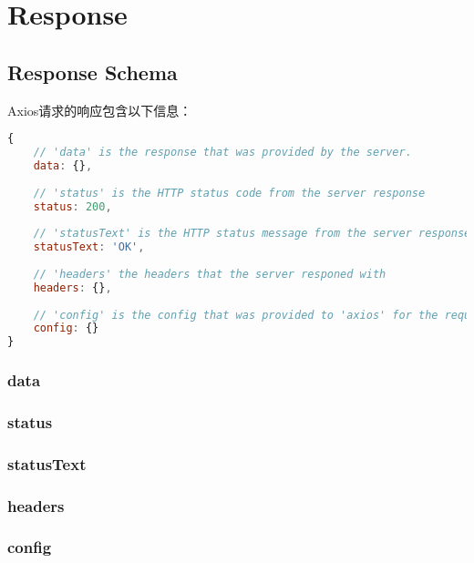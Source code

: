 \chapter{Response}



\section{Response Schema}


Axios请求的响应包含以下信息：



\begin{lstlisting}[language=JavaScript]
{
    // 'data' is the response that was provided by the server.
    data: {},
    
    // 'status' is the HTTP status code from the server response
    status: 200,
    
    // 'statusText' is the HTTP status message from the server response
    statusText: 'OK',
    
    // 'headers' the headers that the server responed with
    headers: {},
    
    // 'config' is the config that was provided to 'axios' for the request
    config: {}
}
\end{lstlisting}

\subsection{data}


\subsection{status}


\subsection{statusText}


\subsection{headers}


\subsection{config}







